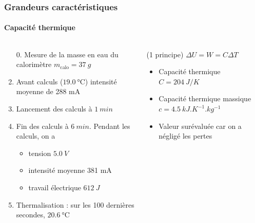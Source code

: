 \documentclass[a4paper,11pt]{beamer}
\newcommand{\cel}{\degreeCelsius}
\begin{document}
\begin{frame}
    \frametitle{Grandeurs caractéristiques}
    \framesubtitle{Capacité thermique}

    \begin{columns}
        \begin{column}{0.55\textwidth}
            \begin{enumerate}
                \item[0.] Mesure de la masse en eau du calorimètre $m_\text{calo} = \SI{37}{g}$
                \item Avant calculs ($\SI{19,0}{\cel}$) intensité moyenne de 288 mA
                \item Lancement des calculs à $\SI{1}{min}$
                \item Fin des calculs à $\SI{6}{min}$. Pendant les calculs, on a
                \begin{itemize}
                    \item tension $\SI{5,0}{V}$
                    \item intensité moyenne 381 mA
                    \item travail électrique $\SI{612}{J}$
                \end{itemize}
                \item Thermalisation : sur les 100 dernières secondes, $\SI{20,6}{\cel}$
            \end{enumerate}
        \end{column}
        \pause
        \vrule{}
        \begin{column}{0.45\textwidth}
            (1\ier{} principe) $\Delta U = W = C \Delta T$
            \begin{itemize}
                \item Capacité thermique $C = \SI{204}{J/K}$
                \item Capacité thermique massique $c = \SI{4,5}{kJ.K^{-1}.kg^{-1}}$
                \item Valeur surévaluée car on a négligé les pertes
            \end{itemize}
        \end{column}
    \end{columns}
\end{frame}
\end{document}
